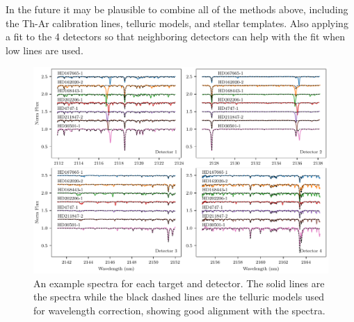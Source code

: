 


In the future it may be plausible to combine all of the methods above, including the Th-Ar calibration lines, telluric models, and stellar templates. Also applying a fit to the 4 detectors so that neighboring detectors can help with the fit when low lines are used.

\begin{figure}
    \centering
    \includegraphics[width=1\linewidth]{figures/reduction/Spectra_examples}
    \caption{An example spectra for each target and detector. The solid lines are the spectra while the black dashed lines are the telluric models used for wavelength correction, showing good alignment with the spectra.}
    \label{fig:spectraexamples}
\end{figure}


